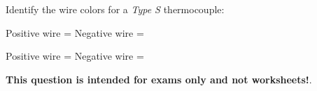 

Identify the wire colors for a {\it Type S} thermocouple:

\vskip 10pt

Positive wire = \underbar{\hskip 50pt} \hskip 100pt Negative wire = \underbar{\hskip 50pt}







Positive wire =   \hskip 100pt Negative wire = 







{\bf This question is intended for exams only and not worksheets!}.


